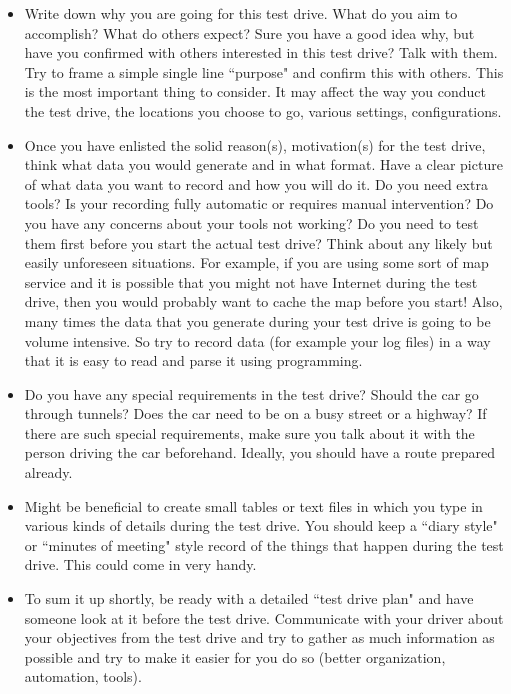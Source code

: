 \documentclass[a4paper, 12pt, oneside]{report}
\begin{document}
  \begin{itemize}
  	
  	\item   Write down why you are going for this test drive. What do you aim to accomplish? What do others expect? Sure you have a good idea why, but have you confirmed with others interested in this test drive? Talk with them. Try to frame a simple single line ``purpose" and confirm this with others. This is the most important thing to consider. It may affect the way you conduct the test drive, the locations you choose to go, various settings, configurations.
  	
  	\item  Once you have enlisted the solid reason(s), motivation(s) for the test drive, think what data you would generate and in what format. Have a clear picture of what data you want to record and how you will do it. Do you need extra tools? Is your recording fully automatic or requires manual intervention? Do you have any concerns about your tools not working? Do you need to test them first before you start the actual test drive? Think about any likely but easily unforeseen situations. For example, if you are using some sort of map service and it is possible that you might not have Internet during the test drive, then you would probably want to cache the map before you start! Also, many times the data that you generate during your test drive is going to be volume intensive. So try to record data (for example your log files) in a way that it is easy to read and parse it using programming.
  		
  	\item Do you have any special requirements in the test drive? Should the car go through tunnels? Does the car need to be on a busy street or a highway? If there are such special requirements, make sure you talk about it with the person driving the car beforehand. Ideally, you should have a route prepared already.
  		
  	\item Might be beneficial to create small tables or text files in which you type in various kinds of details during the test drive. You should keep a ``diary style" or ``minutes of meeting" style record of the things that happen during the test drive. This could come in very handy.
  			
  	\item To sum it up shortly, be ready with a detailed ``test drive plan" and have someone look at it before the test drive. Communicate with your driver about your objectives from the test drive and try to gather as much information as possible and try to make it easier for you do so (better organization, automation, tools).  
    	
  \end{itemize}
  
\end{document}
